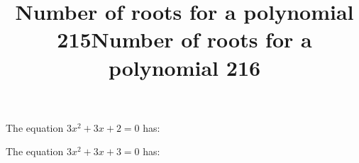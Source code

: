 \documentclass{article}
\begin{document}
\begin{category}
\begin{question}[multichoice]
\end{question}
\begin{question}[multichoice]
\title{Number of roots for a polynomial 215}
The equation $3 x^{2} + 3 x + 2=0$ has:


\end{question}
\begin{question}[multichoice]
\title{Number of roots for a polynomial 216}
The equation $3 x^{2} + 3 x + 3=0$ has:


\end{question}

\end{category}
\end{document}
